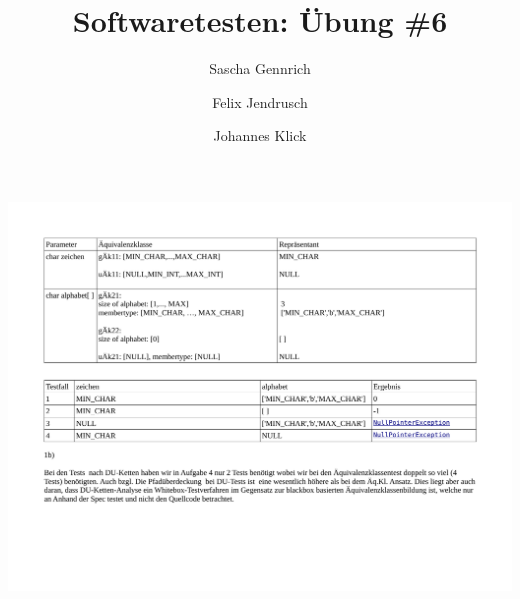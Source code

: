 \documentclass{scrartcl}
\author{Sascha Gennrich \and
    Felix Jendrusch \and
    Johannes Klick}
\title{Softwaretesten: Übung \#6}
\begin{document}
\maketitle

\includegraphics[width=\linewidth]{Aufgabe1}


\end{document}
